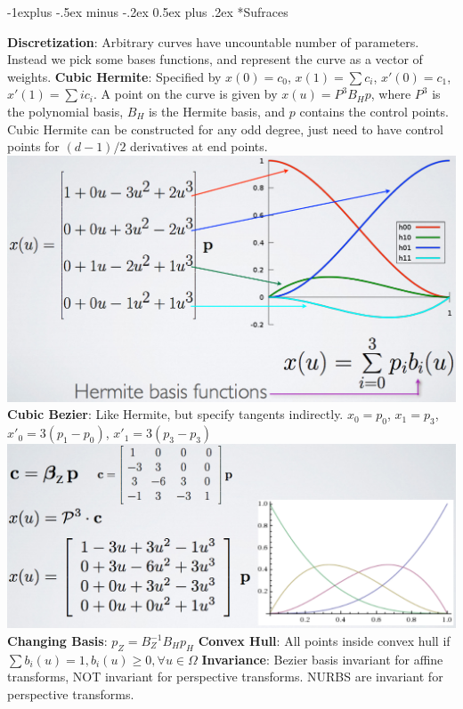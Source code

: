 \documentclass[3pt,landscape]{article}
\makeatletter
\renewcommand{\subsection}{\@startsection{subsection}{2}{0mm}%
                            {-1explus -.5ex minus -.2ex}%
                            {0.5ex plus .2ex}%
                            {\normalfont\normalsize\bfseries}}
\makeatother
\begin{document}
\begin{multicols}{3}
\subsection*{Sufraces}

{\bf Discretization}: Arbitrary curves have uncountable number of parameters. Instead we pick some bases functions, and represent the curve as a vector of weights.
{\bf Cubic Hermite}: Specified by $x(0)=c_0$, $x(1)=\sum c_i$, $x'(0)=c_1$, $x'(1)=\sum ic_i$. A point on the curve is given by $x(u)=P^3B_Hp$, where $P^3$ is the polynomial basis, $B_H$ is the Hermite basis, and $p$ contains the control points. Cubic Hermite can be constructed for any odd degree, just need to have control points for $(d-1)/2$ derivatives at end points.
\includegraphics[scale=0.22]{images/hermite}\\
{\bf Cubic Bezier}: Like Hermite, but specify tangents indirectly. $x_0=p_0$, $x_1=p_3$, $x'_0=3(p_1-p_0)$, $x'_1=3(p_3-p_3)$
\includegraphics[scale=0.20]{images/bezier}\\
{\bf Changing Basis}: $p_Z=B_Z^{-1}B_Hp_H$
{\bf Convex Hull}: All points inside convex hull if $\sum b_i(u)=1, b_i(u)\ge 0, \forall u\in \Omega$
{\bf Invariance}: Bezier basis invariant for affine transforms, NOT invariant for perspective transforms. NURBS are invariant for perspective transforms.

\end{multicols}
\end{document}
